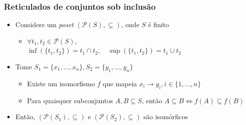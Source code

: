 \documentclass[12pt]{beamer}
\begin{document}
\begin{frame}
  \frametitle{Reticulados de conjuntos sob inclusão}
  \begin{itemize}
    \item Considere um \emph{poset} $(\mathcal{P}(S), \subseteq)$, onde $S$ é
        finito
    \begin{itemize}[itemsep=0pt]
      \item $\forall t_1, t_2 \in \mathcal{P}(S)$, \\
          $\inf(\{t_1, t_2\}) = t_1 \cap t_2, \quad
           \sup(\{t_1, t_2\}) = t_1 \cup t_2$
    \end{itemize}
    \item<2-> Tome $S_{1} = \{x_{1}, \dots, x_{n}\}, S_{2} = \{y_{1}, \dots,
        y_{n}\}$
    \begin{itemize}[itemsep=0pt]
      \item Existe um isomorfismo $f$ que mapeia $x_{i} \rightarrow y_{i}, i
          \in \{1, \dots, n\}$
      \item Para quaisquer subconjuntos $A, B \subseteq S$, então $A \subseteq
          B \Leftrightarrow f(A) \subseteq f(B)$
    \end{itemize}
    \item<3-> Então, $(\mathcal{P}(S_{1}), \subseteq)$ e $(\mathcal{P}(S_{2}),
        \subseteq)$ são isomórficos
  \end{itemize}
\end{frame}
\end{document}
